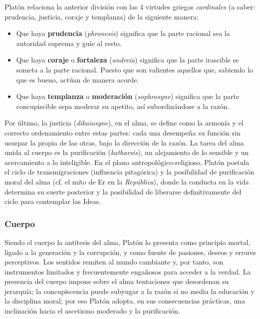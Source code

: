 \documentclass[10pt]{article}
\begin{document}
Platón relaciona la anterior división con las 4 virtudes griegas \textit{cardinales} (a saber: prudencia, justicia, coraje y templanza) de la siguiente manera:

\begin{itemize}
  \item Que haya \textbf{prudencia} (\textit{phronesis}) significa que la parte racional sea la autoridad suprema y guíe al resto.
  \item Que haya \textbf{coraje} o \textbf{fortaleza} (\textit{andreia}) significa que la parte irascible se someta a la parte racional. Puesto que son valientes aquellos que, 
    sabiendo lo que es bueno, actúan de manera acorde.
  \item Que haya \textbf{templanza} o \textbf{moderación} (\textit{sophrosyne}) significa que la parte concupiscible sepa moderar su apetito, así subordinándose a la razón.
\end{itemize}

Por último, la justicia (\textit{dikaiosyne}), en el alma, se define como la armonía y el correcto ordenamiento entre estas partes: cada una desempeña su función sin usurpar
la propia de las otras, bajo la dirección de la razón. La tarea del alma unida al cuerpo es la purificación (\textit{katharsis}), un alejamiento de lo sensible y un acercamiento
a lo inteligible. En el plano antropológico-religioso, Platón postula el ciclo de transmigraciones (influencia pitagórica) y la posibilidad de purificación moral del alma
(cf. el mito de Er en la \textit{República}), donde la conducta en la vida determina su suerte posterior y la posibilidad de liberarse definitivamente del ciclo para contemplar las Ideas.

\subsubsection{Cuerpo}

Siendo el cuerpo la antítesis del alma, Platón lo presenta como principio mortal, ligado a la generación y la corrupción, y como fuente de pasiones, deseos y errores perceptivos.
Los sentidos remiten al mundo cambiante y, por tanto, son instrumentos limitados y frecuentemente engañosos para acceder a la verdad. La presencia del cuerpo impone sobre el alma
tentaciones que desordenan su jerarquía; la concupiscencia puede subyugar a la razón si no media la educación y la disciplina moral; por eso Platón adopta, en sus consecuencias
prácticas, una inclinación hacia el ascetismo moderado y la purificación.
\end{document}
